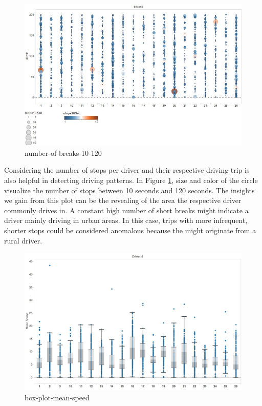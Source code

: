 \documentclass{vldb}
\begin{document}
\begin{figure}
\centering
\includegraphics[width=\linewidth]{"pics/number-of-breaks-10-120"}%
\caption{number-of-breaks-10-120}
\label{fig:number-of-breaks-10-120}
\end{figure}
Considering the number of stops per driver and their respective driving trip is also helpful in detecting driving patterns. In Figure \ref{fig:number-of-breaks-10-120}, size and color of the circle visualize the number of stops between 10 seconds and 120 seconds. The insights we gain from this plot can be the revealing of the area the respective driver commonly drives in. A constant high number of short breaks might indicate a driver mainly driving in urban areas. In this case, trips with more infrequent, shorter stops could be considered anomalous because the might originate from a rural driver.

\begin{figure}
\centering
\includegraphics[width=\linewidth]{"pics/box-plot-mean-speed"}%
\caption{box-plot-mean-speed}
\label{fig:box-plot-mean-speed}
\end{figure}
\end{document}
